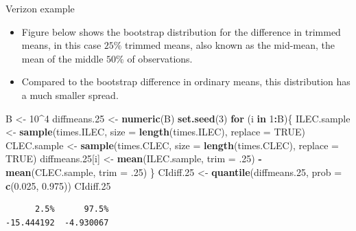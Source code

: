 \documentclass[
  ignorenonframetext,
]{beamer}
\newenvironment{Shaded}{\begin{snugshade}}{\end{snugshade}}
\newcommand{\AttributeTok}[1]{\textcolor[rgb]{0.13,0.29,0.53}{#1}}
\newcommand{\ConstantTok}[1]{\textcolor[rgb]{0.56,0.35,0.01}{#1}}
\newcommand{\ControlFlowTok}[1]{\textcolor[rgb]{0.13,0.29,0.53}{\textbf{#1}}}
\newcommand{\DecValTok}[1]{\textcolor[rgb]{0.00,0.00,0.81}{#1}}
\newcommand{\FloatTok}[1]{\textcolor[rgb]{0.00,0.00,0.81}{#1}}
\newcommand{\FunctionTok}[1]{\textcolor[rgb]{0.13,0.29,0.53}{\textbf{#1}}}
\newcommand{\NormalTok}[1]{#1}
\newcommand{\OtherTok}[1]{\textcolor[rgb]{0.56,0.35,0.01}{#1}}
\newcommand{\SpecialCharTok}[1]{\textcolor[rgb]{0.81,0.36,0.00}{\textbf{#1}}}
\begin{document}
\begin{frame}[fragile]{Verizon example}
\protect\hypertarget{verizon-example-9}{}
\begin{itemize}
\item
  Figure below shows the bootstrap distribution for the difference in
  trimmed means, in this case \(25\%\) trimmed means, also known as the
  mid-mean, the mean of the middle \(50\%\) of observations.
\item
  Compared to the bootstrap difference in ordinary means, this
  distribution has a much smaller spread.
\end{itemize}

\tiny

\begin{Shaded}
\begin{Highlighting}[]
\NormalTok{B }\OtherTok{\textless{}{-}} \DecValTok{10}\SpecialCharTok{\^{}}\DecValTok{4}
\NormalTok{diffmeans}\FloatTok{.25} \OtherTok{\textless{}{-}} \FunctionTok{numeric}\NormalTok{(B)}
\FunctionTok{set.seed}\NormalTok{(}\DecValTok{3}\NormalTok{)}
\ControlFlowTok{for}\NormalTok{ (i }\ControlFlowTok{in} \DecValTok{1}\SpecialCharTok{:}\NormalTok{B)\{}
\NormalTok{  ILEC.sample }\OtherTok{\textless{}{-}} \FunctionTok{sample}\NormalTok{(times.ILEC, }\AttributeTok{size =} \FunctionTok{length}\NormalTok{(times.ILEC), }\AttributeTok{replace =} \ConstantTok{TRUE}\NormalTok{)}
\NormalTok{  CLEC.sample }\OtherTok{\textless{}{-}} \FunctionTok{sample}\NormalTok{(times.CLEC, }\AttributeTok{size =} \FunctionTok{length}\NormalTok{(times.CLEC), }\AttributeTok{replace =} \ConstantTok{TRUE}\NormalTok{)}
\NormalTok{  diffmeans}\FloatTok{.25}\NormalTok{[i] }\OtherTok{\textless{}{-}} \FunctionTok{mean}\NormalTok{(ILEC.sample, }\AttributeTok{trim =}\NormalTok{ .}\DecValTok{25}\NormalTok{) }\SpecialCharTok{{-}} \FunctionTok{mean}\NormalTok{(CLEC.sample, }\AttributeTok{trim =}\NormalTok{ .}\DecValTok{25}\NormalTok{)}
\NormalTok{\}}
\NormalTok{CIdiff}\FloatTok{.25} \OtherTok{\textless{}{-}} \FunctionTok{quantile}\NormalTok{(diffmeans}\FloatTok{.25}\NormalTok{, }\AttributeTok{prob =} \FunctionTok{c}\NormalTok{(}\FloatTok{0.025}\NormalTok{, }\FloatTok{0.975}\NormalTok{))}
\NormalTok{CIdiff}\FloatTok{.25}
\end{Highlighting}
\end{Shaded}

\begin{verbatim}
      2.5%      97.5% 
-15.444192  -4.930067 
\end{verbatim}

\normalsize
\end{frame}
\end{document}

